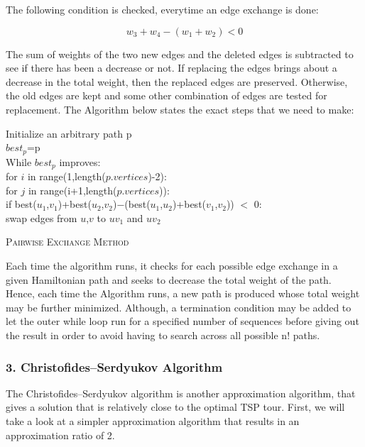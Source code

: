 \documentclass[12pt]{report}
\begin{document}
    The following condition is checked, everytime an edge exchange is done:
    
    \[w_{3}+w_{4} - (w_{1} +w_{2})<0\]
    
    The sum of weights of the two new edges and the deleted edges is subtracted to see if there has been a decrease or not. If replacing the edges brings about a decrease in the total weight, then the replaced edges are preserved. Otherwise, the old edges are kept and some other combination of edges are tested for replacement. The Algorithm below states the exact steps that we need to make:\\
    
    \begin{algorithm*}
        Initialize an arbitrary path p \\
        $best_p$=p \\
        While $best_p$ improves: \\
        for $i$ in range(1,length($p.vertices$)-2): \\
        \quad for $j$ in range(i+1,length($p.vertices$)):\\
        \qquad if best($u_{1}$,$v_{1}$)+best($u_{2}$,$v_{2}$)$-$(best($u_{1}$,$u_{2}$)+best($v_{1}$,$v_{2}$)) $<$ 0:\\
        swap edges from $u$,$v$ to $uv_{1}$ and $uv_{2}$\\
    \caption{\textsc{Pairwise Exchange Method}}
    \end{algorithm*}        
    
    Each time the algorithm runs, it checks for each possible edge exchange in a given Hamiltonian path and seeks to decrease the total weight of the path. Hence, each time the Algorithm runs, a new path is produced whose total weight may be further minimized. Although, a termination condition may be added to let the outer while loop run for a specified number of sequences before giving out the result in order to avoid having to search across all possible n! paths.
    
    \newpage
    \subsubsection{3. Christofides–Serdyukov Algorithm}
    The Christofides–Serdyukov algorithm is another approximation algorithm, that gives a solution that is 
    relatively close to the optimal TSP tour. First, we will take a look at a simpler approximation 
    algorithm that results in an approximation ratio of 2.
\end{document}
